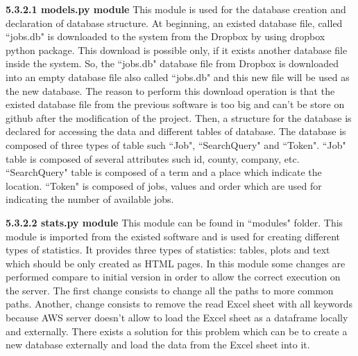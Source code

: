 \documentclass[conference,compsoc]{IEEEtran}
\begin{document}
\noindent
\newline\newline
\textbf{5.3.2.1 models.py module}
\newline\newline
This module is used for the database creation and declaration of database structure.
\newline
At beginning, an existed database file, called ``jobs.db" is downloaded to the system from the Dropbox by using dropbox python package. This download is possible only, if it exists another database file inside the system. So, the ``jobs.db" database file from Dropbox is downloaded into an empty database file also called ``jobs.db" and this new file will be used as the new database. 
\newline
The reason to perform this download operation is that the existed database file from the previous software is too big and can't be store on github after the modification of the project.                                                  
\newline
Then, a structure for the database is declared for accessing the data and different tables of database. The database is composed of three types of table such ``Job", ``SearchQuery" and ``Token". 
\newline
``Job" table is composed of several attributes such id, county, company, etc. ``SearchQuery" table is composed of a term and a place which indicate the location. ``Token" is composed of jobs, values and order which are used for indicating the number of available jobs. 

\noindent
\newline\newline
\textbf{5.3.2.2 stats.py module}
\newline\newline
This module can be found in ``modules" folder. This module is imported from the existed software and is used for creating different types of statistics.
\newline
It provides three types of statistics: tables, plots and text which should be only created as HTML pages. In this module some changes are performed compare to initial version in order to allow the correct execution on the server. 
\newline
The first change consists to change all the paths to more common paths. Another, change consists to remove the read Excel sheet with all keywords because AWS server doesn't allow to load the Excel sheet as a dataframe locally and externally. There exists a solution for this problem which can be to create a new database externally and load the data from the Excel sheet into it.  
\end{document}
